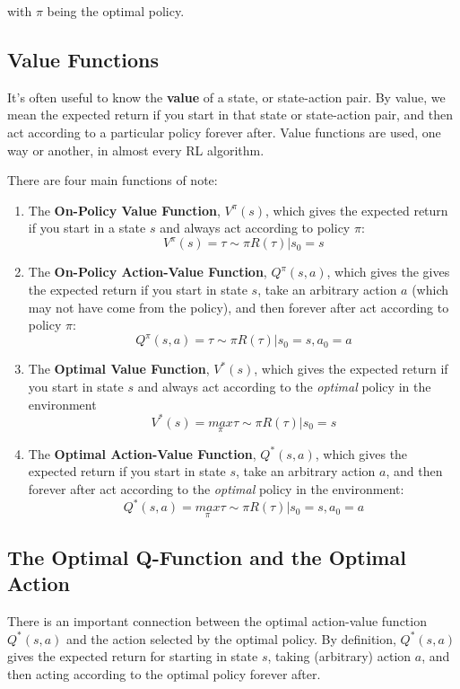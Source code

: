 with $\pi$ being the optimal policy.

\subsection{Value Functions}
It's often useful to know the \textbf{value} of a state, or state-action pair. By value, we mean the expected return if you start in
that state or state-action pair, and then act according to a particular policy forever after. Value functions are used, one way or another, in almost every RL algorithm.

There are four main functions of note:
\begin{enumerate}
\item The \textbf{On-Policy Value Function}, $V^{\pi}(s)$, which gives the expected return if you start in a state $s$ and always act according to policy $\pi$:
	\begin{equation}
	V^{\pi}(s) = \tau \sim \pi R(\tau)|s_{0} = s
	\end{equation}
\item The \textbf{On-Policy Action-Value Function}, $Q^{\pi}(s, a)$, which gives the gives the expected return if you start in state $s$, take an arbitrary action $a$ (which may not have come from the policy), and then forever after act according to policy
$\pi$:
	\begin{equation}
	Q^{\pi}(s, a) = \tau \sim \pi R(\tau)|s_{0} = s, a_{0} = a
	\end{equation}
\item The \textbf{Optimal Value Function}, $V^{*}(s)$, which gives the expected return if you start in state $s$ and always act according to the \textit{optimal} policy in the environment
	\begin{equation}
	V^{*}(s) = \underset{\pi}{max} \tau \sim \pi R(\tau)|s_{0} = s
	\end{equation}
\item The \textbf{Optimal Action-Value Function}, $Q^{*}(s, a)$, which gives the expected return if you start in state $s$, take an arbitrary action $a$, and then forever after act according to the \textit{optimal} policy in the environment:
	\begin{equation}
	Q^{*}(s, a) = \underset{\pi}{max} \tau \sim \pi R(\tau)|s_{0} = s, a_{0} = a
	\end{equation}
\end{enumerate}

\subsection{The Optimal Q-Function and the Optimal Action}
There is an important connection between the optimal action-value function $Q^{*}(s, a)$ and the action selected by the optimal policy. By definition, $Q^{*}(s, a)$ gives the expected return for starting in state $s$, taking (arbitrary) action $a$, and then acting according to the optimal policy forever after.

